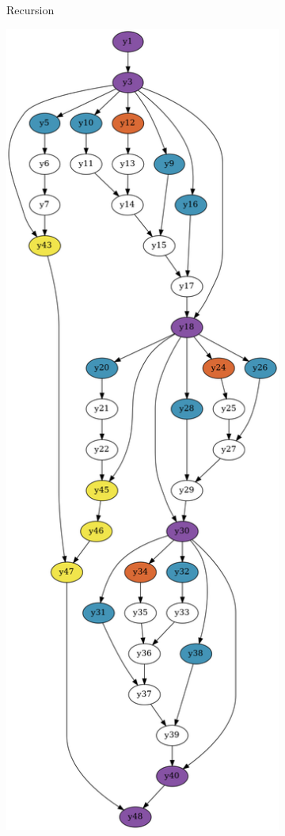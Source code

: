 \documentclass[../thesis.tex]{subfiles}
\begin{document}
\begin{figure}[htbp]
\begin{adjustwidth}{-2cm}{-2cm}
\begin{subfigure}{0.28\textwidth}
    \caption{Recursion}
    \end{subfigure}
    \captionsetup{justification = centering,
    singlelinecheck = false}
    \begin{subfigure}{0.28\textwidth}
      \centering
    \includegraphics[width=\textwidth]{graph_if2.png}

\end{subfigure}
\end{adjustwidth}
\end{figure}
\end{document}
